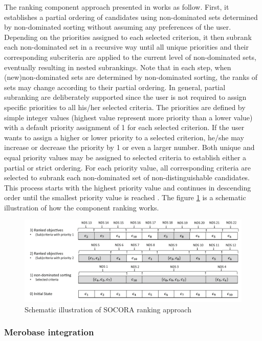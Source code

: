 The ranking component approach presented in \cite{Kessel2016} works as follow. First, it establishes a partial ordering of candidates using non-dominated sets determined by non-dominated sorting without assuming any preferences of the user. Depending on the priorities assigned to each selected criterion, it then subrank each non-dominated set in a recursive way until all unique priorities and their corresponding subcriteria are applied to the current level of non-dominated sets, eventually resulting in nested subrankings. Note that in each step, when (new)non-dominated sets are determined by non-dominated sorting, the ranks of sets may change according to their partial ordering. In general, partial subranking are deliberately supported since the user is not required to assign specific priorities to all his/her selected criteria. The priorities are defined by simple integer values (highest value represent more priority than a lower value) with a default priority assignment of 1 for each selected criterion. If the user wants to assign a higher or lower priority to a selected criterion, he/she may increase or decrease the priority by 1 or even a larger number. Both unique and equal priority values may be assigned to selected criteria to establish either a partial or strict ordering. For each priority value, all corresponding criteria are selected to subrank each non-dominated set of non-distinguishable candidates. This process starts with the highest priority value and continues in descending order until the smallest priority value is reached \citep{Kessel2016}. The figure \ref{fig:socora-ex} is a schematic illustration of how the component ranking works.

\begin{figure}[ht]
	\centering
    \includegraphics[width=\textwidth]{grafiken/socoraExample}
    \caption{Schematic illustration of SOCORA ranking approach \citep{Kessel2016}}
    \label{fig:socora-ex}
\end{figure}

\subsubsection{Merobase integration}

